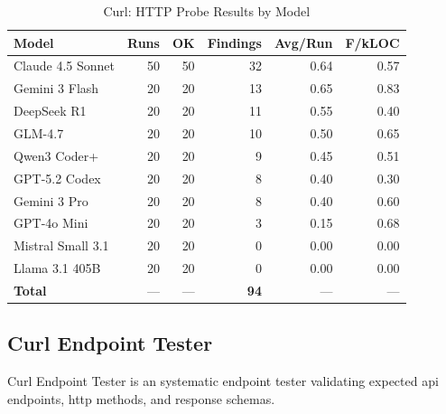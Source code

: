 \begin{table}[htbp]
    \centering
    \caption{Curl: HTTP Probe Results by Model}
    \label{tab:tool_curl}
    \small
    \begin{tabular}{@{} l r r r r r @{}}
        \toprule
        \textbf{Model} & \textbf{Runs} & \textbf{OK} & \textbf{Findings} & \textbf{Avg/Run} & \textbf{F/kLOC} \\
        \midrule
        Claude 4.5 Sonnet & 50 & 50 & 32 & 0.64 & 0.57 \\
        Gemini 3 Flash & 20 & 20 & 13 & 0.65 & 0.83 \\
        DeepSeek R1 & 20 & 20 & 11 & 0.55 & 0.40 \\
        GLM-4.7 & 20 & 20 & 10 & 0.50 & 0.65 \\
        Qwen3 Coder+ & 20 & 20 & 9 & 0.45 & 0.51 \\
        GPT-5.2 Codex & 20 & 20 & 8 & 0.40 & 0.30 \\
        Gemini 3 Pro & 20 & 20 & 8 & 0.40 & 0.60 \\
        GPT-4o Mini & 20 & 20 & 3 & 0.15 & 0.68 \\
        Mistral Small 3.1 & 20 & 20 & 0 & 0.00 & 0.00 \\
        Llama 3.1 405B & 20 & 20 & 0 & 0.00 & 0.00 \\
        \midrule
        \textbf{Total} & --- & --- & \textbf{94} & --- & --- \\
        \bottomrule
    \end{tabular}
\end{table}

\subsection{Curl Endpoint Tester}

Curl Endpoint Tester is an systematic endpoint tester validating expected api endpoints, http methods, and response schemas.

